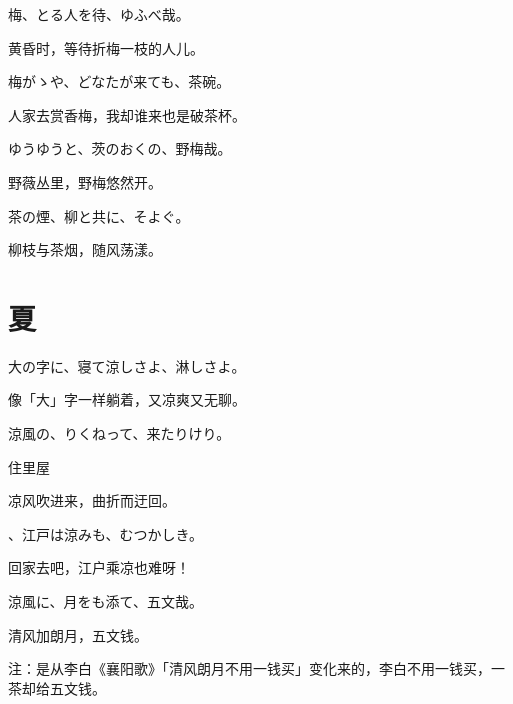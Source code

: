 \begin{haiku}
    {\FH 梅、とる人を待、ゆふべ哉。}

    {\FK 黄昏时，等待折梅一枝的人儿。}
\end{haiku}

\begin{haiku}
    {\FH 梅がゝや、どなたが来ても、茶碗。}

    {\FK 人家去赏香梅，我却谁来也是破茶杯。}
\end{haiku}

\begin{haiku}
    {\FH ゆうゆうと、茨のおくの、野梅哉。}

    {\FK 野薇丛里，野梅悠然开。}
\end{haiku}

\begin{haiku}
    {\FH 茶の煙、柳と共に、そよぐ。}

    {\FK 柳枝与茶烟，随风荡漾。}
\end{haiku}

\section{\FK 夏}

\setcounter{haikucounter}{0}

\begin{haiku}
    {\FH 大の字に、寝て涼しさよ、淋しさよ。}

    {\FK 像「大」字一样躺着，又凉爽又无聊。}
\end{haiku}

\begin{haiku}
    {\FH 涼風の、りくねって、来たりけり。}

    {\FK 住里屋}

    {\FK 凉风吹进来，曲折而迂回。}
\end{haiku}

\begin{haiku}
    {\FH {}、江戸は涼みも、むつかしき。}

    {\FK 回家去吧，江户乘凉也难呀！}
\end{haiku}

\begin{haiku}
    {\FH 涼風に、月をも添て、五文哉。}

    {\FK 清风加朗月，五文钱。}

    {\FT 注：是从李白《襄阳歌》「清风朗月不用一钱买」变化来的，李白不用一钱买，一茶却给五文钱。}
\end{haiku}

